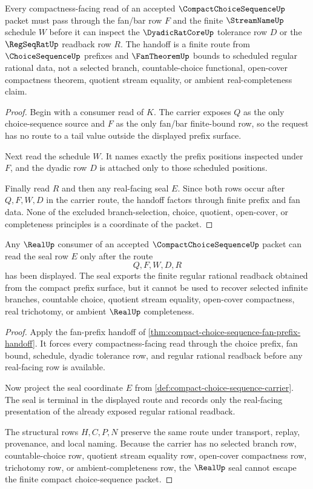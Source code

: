 \begin{theorem}
\label{thm:compact-choice-sequence-fan-prefix-handoff}
Every compactness-facing read of an accepted $\CompactChoiceSequenceUp$ packet must pass through the fan/bar row $F$ and the finite $\StreamNameUp$ schedule $W$ before it can inspect the $\DyadicRatCoreUp$ tolerance row $D$ or the $\RegSeqRatUp$ readback row $R$. The handoff is a finite route from $\ChoiceSequenceUp$ prefixes and $\FanTheoremUp$ bounds to scheduled regular rational data, not a selected branch, countable-choice functional, open-cover compactness theorem, quotient stream equality, or ambient real-completeness claim.
\end{theorem}
\begin{proof}
Begin with a consumer read of $K$. The carrier exposes $Q$ as the only choice-sequence source and $F$ as the only fan/bar finite-bound row, so the request has no route to a tail value outside the displayed prefix surface.

Next read the schedule $W$. It names exactly the prefix positions inspected under $F$, and the dyadic row $D$ is attached only to those scheduled positions.

Finally read $R$ and then any real-facing seal $E$. Since both rows occur after $Q,F,W,D$ in the carrier route, the handoff factors through finite prefix and fan data. None of the excluded branch-selection, choice, quotient, open-cover, or completeness principles is a coordinate of the packet.
\end{proof}

\begin{theorem}
\label{thm:compact-choice-sequence-real-seal-nonescape}
Any $\RealUp$ consumer of an accepted $\CompactChoiceSequenceUp$ packet can read the seal row $E$ only after the route
$$
Q,F,W,D,R
$$
has been displayed. The seal exports the finite regular rational readback obtained from the compact prefix surface, but it cannot be used to recover selected infinite branches, countable choice, quotient stream equality, open-cover compactness, real trichotomy, or ambient $\RealUp$ completeness.
\end{theorem}
\begin{proof}
Apply the fan-prefix handoff of \autoref{thm:compact-choice-sequence-fan-prefix-handoff}. It forces every compactness-facing read through the choice prefix, fan bound, schedule, dyadic tolerance row, and regular rational readback before any real-facing row is available.

Now project the seal coordinate $E$ from \autoref{def:compact-choice-sequence-carrier}. The seal is terminal in the displayed route and records only the real-facing presentation of the already exposed regular rational readback.

The structural rows $H,C,P,N$ preserve the same route under transport, replay, provenance, and local naming. Because the carrier has no selected branch row, countable-choice row, quotient stream equality row, open-cover compactness row, trichotomy row, or ambient-completeness row, the $\RealUp$ seal cannot escape the finite compact choice-sequence packet.
\end{proof}

